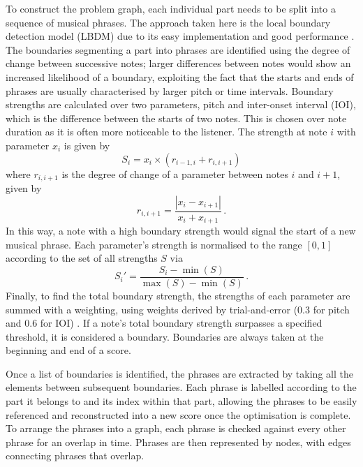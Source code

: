 \documentclass[12pt]{article}
\begin{document}
To construct the problem graph, each individual part needs to be split into a sequence of musical phrases. The approach taken here is the local boundary detection model (LBDM) due to its easy implementation and good performance . The boundaries segmenting a part into phrases are identified using the degree of change between successive notes; larger differences between notes would show an increased likelihood of a boundary, exploiting the fact that the starts and ends of phrases are usually characterised by larger pitch or time intervals. Boundary strengths are calculated over two parameters, pitch and inter-onset interval (IOI), which is the difference between the starts of two notes. This is chosen over note duration as it is often more noticeable to the listener. The strength at note $i$ with parameter $x_i$ is given by
\begin{equation}
    S_i=x_i\times (r_{i-1, i} + r_{i, i+1})
    \label{eq:boundary-strength}
\end{equation}
where $r_{i, i+1}$ is the degree of change of a parameter between notes $i$ and $i+1$, given by
\begin{equation}
    r_{i, i+1}=\frac{|x_{i}-x_{i+1}|}{x_{i}+x_{i+1}} \,.
    \label{eq:degree-change}
\end{equation}
In this way, a note with a high boundary strength would signal the start of a new musical phrase. Each parameter's strength is normalised to the range $[0,1]$ according to the set of all strengths $S$ via
\begin{equation}
    S_i'=\frac{S_i-\min(S)}{\max(S)-\min(S)} \,.
    \label{eq:normalisation}
\end{equation}
Finally, to find the total boundary strength, the strengths of each parameter are summed with a weighting, using weights derived by trial-and-error ($0.3$ for pitch and $0.6$ for IOI) . If a note's total boundary strength surpasses a specified threshold, it is considered a boundary. Boundaries are always taken at the beginning and end of a score.

Once a list of boundaries is identified, the phrases are extracted by taking all the elements between subsequent boundaries. Each phrase is labelled according to the part it belongs to and its index within that part, allowing the phrases to be easily referenced and reconstructed into a new score once the optimisation is complete. To arrange the phrases into a graph, each phrase is checked against every other phrase for an overlap in time. Phrases are then represented by nodes, with edges connecting phrases that overlap.
\end{document}
